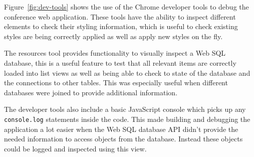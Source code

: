 \documentclass[11pt, a4paper]{article}
\begin{document}
Figure~\ref{fig:dev-tools} shows the use of the Chrome developer tools to debug
the conference web application. These tools have the ability to inspect
different elements to check their styling information, which is useful to check
existing styles are being correctly applied as well as apply new styles on the
fly.

The resources tool provides functionality to visually inspect a Web SQL
database, this is a useful feature to test that all relevant items are
correctly loaded into list views as well as being able to check to state of the
database and the connections to other tables. This was especially useful when
different databases were joined to provide additional information.

The developer tools also include a basic JavaScript console which picks up any
\texttt{console.log} statements inside the code. This made building and
debugging the application a lot easier when the Web SQL database API didn't
provide the needed information to access objects from the database. Instead
these objects could be logged and inspected using this view.
\end{document}
